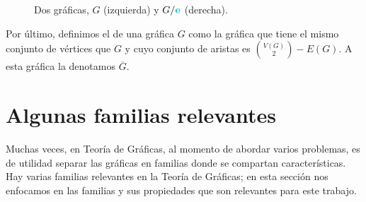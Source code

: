 \begin{figure}[htb!]
    \centering
    \caption{Dos gr\'aficas, $G$ (izquierda) y
    $G/{\color{azulCielo}\textbf{e}}$ (derecha).}
\label{fig:ex-contract}
\end{figure}

Por \'ultimo, definimos el  de una gr\'afica
$G$ como la gr\'afica que tiene el mismo conjunto de v\'ertices que $G$ y cuyo
conjunto de aristas es $\binom{V(G)}{2} - E(G)$. A esta gr\'afica la denotamos
$\overline{G}$.

\newpage

\section{Algunas familias relevantes}
\label{sec:famGraf}
   
Muchas veces, en Teor\'ia de Gr\'aficas, al momento de abordar varios problemas,
es de utilidad separar las gr\'aficas en familias donde se compartan
caracter\'isticas. Hay varias familias relevantes en la Teor\'ia de Gr\'aficas;
en esta secci\'on nos enfocamos en las familias y sus propiedades que son
relevantes para este trabajo.

